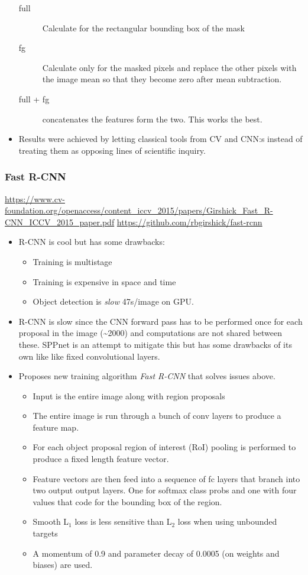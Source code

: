 \documentclass[11pt]{article}
\begin{document}
\begin{itemize}
\begin{description}
\item[{full}] Calculate for the rectangular bounding box of the mask
\item[{fg}] Calculate only for the masked pixels and replace the other pixels with the image mean so that they become zero after mean subtraction.
\item[{full + fg}] concatenates the features form the two. This works the best.
\end{description}
\item Results were achieved by letting classical tools from CV and CNN:s instead of treating them as opposing lines of scientific inquiry.
\end{itemize}


\subsubsection{Fast R-CNN}
\label{sec:org1f08276}
\url{https://www.cv-foundation.org/openaccess/content\_iccv\_2015/papers/Girshick\_Fast\_R-CNN\_ICCV\_2015\_paper.pdf}
\url{https://github.com/rbgirshick/fast-rcnn}

\begin{itemize}
\item R-CNN is cool but has some drawbacks:
\begin{itemize}
\item Training is multistage
\item Training is expensive in space and time
\item Object detection is \emph{slow} 47s/image on GPU.
\end{itemize}
\item R-CNN is slow since the CNN forward pass has to be performed once for each proposal in the image (\textasciitilde{}2000) and computations are not shared between these. SPPnet is an attempt to mitigate this but has some drawbacks of its own like like fixed convolutional layers.
\item Proposes new training algorithm \emph{Fast R-CNN} that solves issues above.
\begin{itemize}
\item Input is the entire image along with region proposals
\item The entire image is run through a bunch of conv layers to produce a feature map.
\item For each object proposal region of interest (RoI) pooling is performed to produce a fixed length feature vector.
\item Feature vectors are then feed into a sequence of fc layers that branch into two output output layers. One for softmax class probs and one with four values that code for the bounding box of the region.
\item Smooth L\(_{\text{1}}\) loss is less sensitive than L\(_{\text{2}}\) loss when using unbounded targets
\item A momentum of 0.9 and parameter decay of 0.0005 (on weights and biases) are used.
\end{itemize}
\end{itemize}
\end{document}
